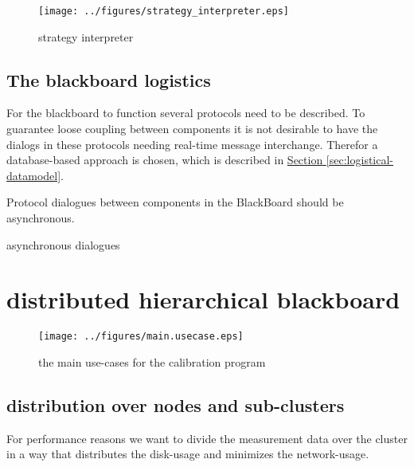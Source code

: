 \documentclass[]{lofar}
\begin{document}
      \begin{figure}
        \texttt{[image: ../figures/strategy\_interpreter.eps]}
        \hypertarget{fig:strategy_interpreter}{}
        \caption{strategy interpreter\label{fig:strategy_interpreter}}
      \end{figure}

    \subsection{The blackboard logistics}
    \label{subsec:blackboard-logistics}\hypertarget{subsec:blackboard-logistics}{}

      For the blackboard to function several protocols need to be
      described. To guarantee loose coupling between components it is
      not desirable to have the dialogs in these protocols needing
      real-time message interchange. Therefor a database-based
      approach is chosen, which is described in
      \hyperlink{sec:logistical-datamodel}{Section
      \ref{sec:logistical-datamodel}}.

      \begin{requirement}
        Protocol dialogues between components in the BlackBoard should
        be asynchronous.
        \caption{asynchronous dialogues\label{req:asynchronous}}
      \end{requirement}

  \section{distributed hierarchical blackboard}
  \label{sec:distributed-hierarchical-blackboard}\hypertarget{sec:distributed-hierarchical-blackboard}{}%

      \begin{figure}
        \texttt{[image: ../figures/main.usecase.eps]}
        \hypertarget{fig:main.usecase}{}
        \caption{the main use-cases for the calibration program\label{fig:main.usecase}}
      \end{figure}

    \subsection{distribution over nodes and sub-clusters}
    \label{subsec:distribution}\hypertarget{subsec:distribution}{}%

      For performance reasons we want to divide the measurement data
      over the cluster in a way that distributes the disk-usage and
      minimizes the network-usage.
\end{document}
